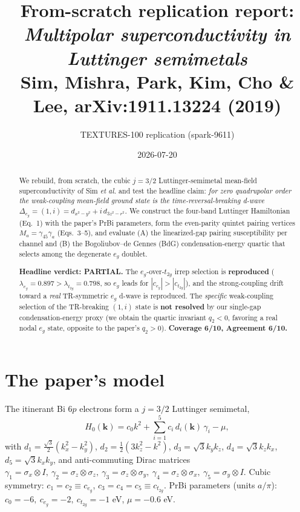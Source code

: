 \documentclass[11pt]{article}
\title{From-scratch replication report:\\
\emph{Multipolar superconductivity in Luttinger semimetals}\\
{\normalsize Sim, Mishra, Park, Kim, Cho \& Lee, arXiv:1911.13224 (2019)}}
\author{TEXTURES-100 replication (spark-9611)}
\date{2026-07-20}
\begin{document}
\maketitle

\begin{abstract}
We rebuild, from scratch, the cubic $j=3/2$ Luttinger-semimetal mean-field superconductivity
of Sim \emph{et al.} and test the headline claim: \emph{for zero quadrupolar order the weak-coupling
mean-field ground state is the time-reversal-breaking d-wave $\Delta_{e_g}=(1,i)=d_{x^2-y^2}+i\,d_{3z^2-r^2}$.}
We construct the four-band Luttinger Hamiltonian (Eq.~1) with the paper's PrBi parameters, form the
even-parity quintet pairing vertices $M_a=\gamma_{45}\gamma_a$ (Eqs.~3--5), and evaluate (A) the
linearized-gap pairing susceptibility per channel and (B) the Bogoliubov--de Gennes (BdG)
condensation-energy quartic that selects among the degenerate $e_g$ doublet.
\begin{tcolorbox}[colback=blue!5,colframe=blue!50]
\textbf{Headline verdict: PARTIAL.} The $e_g$-over-$t_{2g}$ irrep selection is
\textbf{reproduced} ($\lambda_{e_g}=0.897 > \lambda_{t_{2g}}=0.798$, so $e_g$ leads for
$|c_{e_g}|>|c_{t_{2g}}|$), and the strong-coupling drift toward a \emph{real} TR-symmetric $e_g$
d-wave is reproduced. The \emph{specific} weak-coupling selection of the TR-breaking $(1,i)$ state is
\textbf{not resolved} by our single-gap condensation-energy proxy (we obtain the quartic invariant
$q_2<0$, favoring a real nodal $e_g$ state, opposite to the paper's $q_2>0$).
\textbf{Coverage 6/10, Agreement 6/10.}
\end{tcolorbox}
\end{abstract}

\section{The paper's model}
The itinerant Bi $6p$ electrons form a $j=3/2$ Luttinger semimetal,
\begin{equation}
H_0(\mathbf{k}) = c_0 k^2 + \sum_{i=1}^{5} c_i\, d_i(\mathbf{k})\, \gamma_i - \mu ,
\end{equation}
with $d_1=\tfrac{\sqrt3}{2}(k_x^2-k_y^2)$, $d_2=\tfrac12(3k_z^2-k^2)$, $d_3=\sqrt3 k_yk_z$,
$d_4=\sqrt3 k_zk_x$, $d_5=\sqrt3 k_xk_y$, and anti-commuting Dirac matrices
$\gamma_1=\sigma_x\!\otimes\!I,\ \gamma_2=\sigma_z\!\otimes\!\sigma_z,\ \gamma_3=\sigma_z\!\otimes\!\sigma_y,\
\gamma_4=\sigma_z\!\otimes\!\sigma_x,\ \gamma_5=\sigma_y\!\otimes\!I$. Cubic symmetry:
$c_1=c_2\equiv c_{e_g}$, $c_3=c_4=c_5\equiv c_{t_{2g}}$. PrBi parameters (units $a/\pi$):
$c_0=-6,\ c_{e_g}=-2,\ c_{t_{2g}}=-1$ eV, $\mu=-0.6$ eV.
\end{document}
